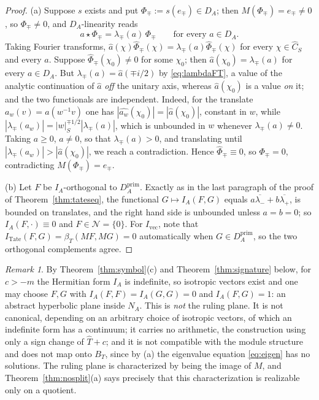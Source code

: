 \documentclass[11pt]{amsart}
\theoremstyle{definition}
\theoremstyle{remark}
\newtheorem{remark}[theorem]{Remark}
\newcommand{\Th}{\widehat{T}}
\newcommand{\Ch}{\widehat{C}_S}
\newcommand{\DA}{D_A}
\newcommand{\Nrad}{\mathcal N}
\newcommand{\BT}{B_T}
\begin{document}
\begin{proof}
(a)  Suppose $s$ exists and put $\Phi_{\mp}:=s(e_{\mp})\in\DA$; then
$M(\Phi_{\mp})=e_{\mp}\ne0$, so $\Phi_{\mp}\ne0$, and $\DA$-linearity reads
\begin{equation}\label{eq:eigen}
a\star\Phi_{\mp}=\lambda_{\mp}(a)\,\Phi_{\mp}\qquad\text{for every }a\in\DA .
\end{equation}
Taking Fourier transforms, $\widehat a(\chi)\widehat\Phi_{\mp}(\chi)=
\lambda_{\mp}(a)\widehat\Phi_{\mp}(\chi)$ for every $\chi\in\Ch$ and every $a$.
Suppose $\widehat\Phi_{\mp}(\chi_0)\ne0$ for some $\chi_0$; then
$\widehat a(\chi_0)=\lambda_{\mp}(a)$ for every $a\in\DA$.  But
$\lambda_{\mp}(a)=\widehat a(\mp i/2)$ by \eqref{eq:lambdaFT}, a value of the
analytic continuation of $\widehat a$ \emph{off} the unitary axis, whereas
$\widehat a(\chi_0)$ is a value \emph{on} it; and the two functionals are
independent.  Indeed, for the translate $a_w(v)=a(w^{-1}v)$ one has
$|\widehat{a_w}(\chi_0)|=|\widehat a(\chi_0)|$, constant in $w$, while
$|\lambda_{\mp}(a_w)|=|w|_S^{\mp1/2}|\lambda_{\mp}(a)|$, which is unbounded in
$w$ whenever $\lambda_{\mp}(a)\ne0$.  Taking $a\ge0$, $a\ne0$, so that
$\lambda_{\mp}(a)>0$, and translating until
$|\lambda_{\mp}(a_w)|>|\widehat a(\chi_0)|$, we reach a contradiction.  Hence
$\widehat\Phi_{\mp}\equiv0$, so $\Phi_{\mp}=0$, contradicting
$M(\Phi_{\mp})=e_{\mp}$.

(b)  Let $F$ be $I_A$-orthogonal to $\DA^{\mathrm{prim}}$.  Exactly as in the
last paragraph of the proof of Theorem~\ref{thm:tateseq}, the functional
$G\mapsto I_A(F,G)$ equals $a\overline{\lambda_-}+b\overline{\lambda_+}$, is
bounded on translates, and the right hand side is unbounded unless $a=b=0$;
so $I_A(F,\cdot)\equiv0$ and $F\in\Nrad=\{0\}$.  For $I_{\mathrm{vec}}$, note
that $I_{\mathrm{Tate}}(F,G)=\beta_T(MF,MG)=0$ automatically when
$G\in\DA^{\mathrm{prim}}$, so the two orthogonal complements agree.
\end{proof}

\begin{remark}\label{rem:weakhyp}
By Theorem~\ref{thm:symbol}(c) and Theorem~\ref{thm:signature} below, for
$c>-m$ the Hermitian form $I_A$ is indefinite, so isotropic vectors exist and
one may choose $F,G$ with $I_A(F,F)=I_A(G,G)=0$ and $I_A(F,G)=1$: an abstract
hyperbolic plane inside $N_A$.  This is \emph{not} the ruling plane.  It is not
canonical, depending on an arbitrary choice of isotropic vectors, of which an
indefinite form has a continuum; it carries no arithmetic, the construction
using only a sign change of $\Th+c$; and it is not compatible with the module
structure and does not map onto $\BT$, since by (a) the eigenvalue equation
\eqref{eq:eigen} has no solutions.  The ruling plane is characterized by being
the image of $M$, and Theorem~\ref{thm:nosplit}(a) says precisely that this
characterization is realizable only on a quotient.
\end{remark}
\end{document}
